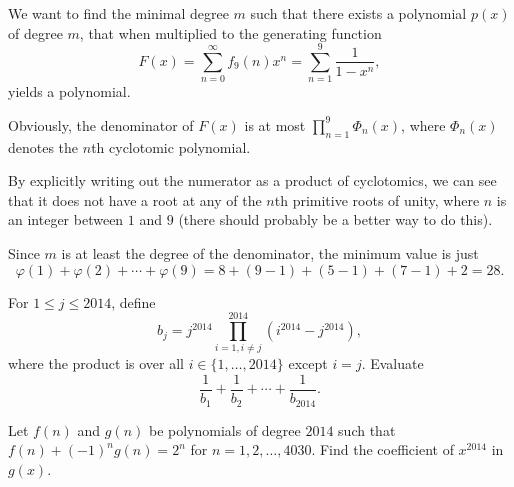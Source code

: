 \documentclass[11pt]{article}
\theoremstyle{definition}
\begin{document}
\begin{solution}[name={Solution by Nyash}]
	We want to find the minimal degree $m$ such that there exists a polynomial $p(x)$ of degree $m$, that when multiplied to the generating function\[F(x) = \displaystyle\sum_{n=0}^{\infty}f_9(n)x^n = \sum_{n=1}^9\dfrac{1}{1-x^n},\]yields a polynomial.
	
	Obviously, the denominator of $F(x)$ is at most $\prod_{n=1}^9\Phi_n(x)$, where $\Phi_n(x)$ denotes the $n$th cyclotomic polynomial.
	
	By explicitly writing out the numerator as a product of cyclotomics, we can see that it does not have a root at any of the $n$th primitive roots of unity, where $n$ is an integer between $1$ and $9$ (there should probably be a better way to do this).
	
	Since $m$ is at least the degree of the denominator, the minimum value is just\[\varphi(1)+\varphi(2)+\cdots+\varphi(9)= 8+(9-1)+(5-1)+(7-1)+2=\boxed{28}.\]
\end{solution}







\begin{question}[name={2014 HMMT, Guts, \href{https://artofproblemsolving.com/community/c129h603986p3586745}{Problem 26}}]
	For $1\leq j\leq 2014$, define\[b_j=j^{2014}\prod_{i=1, i\neq j}^{2014}(i^{2014}-j^{2014}),\]where the product is over all $i\in\{1,\ldots,2014\}$ except $i=j$. Evaluate\[\dfrac1{b_1}+\dfrac1{b_2}+\cdots+\dfrac1{b_{2014}}.\]
\end{question}




%	







\begin{question}[name={2014 HMMT, Guts, \href{https://artofproblemsolving.com/community/c129h603988p3586749}{Problem 28}}]
	Let $f(n)$ and $g(n)$ be polynomials of degree $2014$ such that $f(n)+(-1)^ng(n)=2^n$ for $n=1,2,\ldots,4030$. Find the coefficient of $x^{2014}$ in $g(x)$.	
\end{question}




%	
\end{document}
